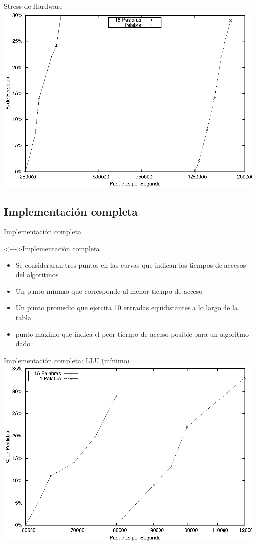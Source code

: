 \documentclass[xcolor=dvipsnames]{beamer}
\begin{document}
\begin{frame}{Stress de Hardware} 
\center	
\includegraphics[scale=0.70]{figures/loop.eps} 
\end{frame}

\subsection{Implementación completa}
\begin{frame}{Implementación completa} 
 \begin{block}<+->{Implementación completa}   
    \begin{itemize}
      \scriptsize
     	\item Se consideraran tres puntos en las curvas que indican los tiempos de accesos del algoritmos
     	\item Un punto mínimo que corresponde al menor tiempo de acceso
	\item Un punto promedio que ejercita 10 entradas equidistantes a lo largo de la tabla
	\item punto máximo que indica el peor tiempo de acceso posible para un algoritmo dado	
    \end{itemize}
  \end{block}
\end{frame}

\begin{frame}{Implementación completa: LLU (mínimo)} 
\center	
\includegraphics[scale=0.70]{figures/llumin.eps} 
\end{frame}
\end{document}
